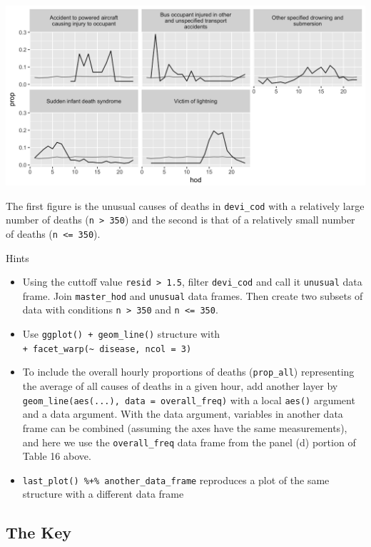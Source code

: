 \documentclass[]{book}
\theoremstyle{definition}
\theoremstyle{definition}
\theoremstyle{remark}
\begin{document}
\begin{center}\includegraphics[width=1\linewidth]{tidy_case_study/unusual-sml} \end{center}

The first figure is the unusual causes of deaths in \texttt{devi\_cod}
with a relatively large number of deaths
(\texttt{n\ \textgreater{}\ 350}) and the second is that of a relatively
small number of deaths (\texttt{n\ \textless{}=\ 350}).

Hints

\begin{itemize}
\item
  Using the cuttoff value \texttt{resid\ \textgreater{}\ 1.5}, filter
  \texttt{devi\_cod} and call it \texttt{unusual} data frame. Join
  \texttt{master\_hod} and \texttt{unusual} data frames. Then create two
  subsets of data with conditions \texttt{n\ \textgreater{}\ 350} and
  \texttt{n\ \textless{}=\ 350}.
\item
  Use \texttt{ggplot()\ +\ geom\_line()} structure with
  \texttt{+\ facet\_warp(\textasciitilde{}\ disease,\ ncol\ =\ 3)}
\item
  To include the overall hourly proportions of deaths
  (\texttt{prop\_all}) representing the average of all causes of deaths
  in a given hour, add another layer by
  \texttt{geom\_line(aes(...),\ data\ =\ overall\_freq)} with a local
  \texttt{aes()} argument and a data argument. With the data argument,
  variables in another data frame can be combined (assuming the axes
  have the same measurements), and here we use the
  \texttt{overall\_freq} data frame from the panel (d) portion of Table
  16 above.
\item
  \texttt{last\_plot()\ \%+\%\ another\_data\_frame} reproduces a plot
  of the same structure with a different data frame
\end{itemize}

\subsection*{The Key}\label{the-key}
\end{document}
